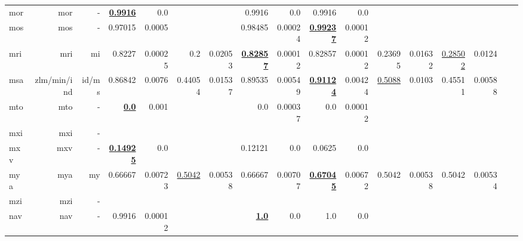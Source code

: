 \documentclass[11pt]{article}
\begin{document}
\begin{table*}[h]
{\begin{tabular}{lrrrrrrrrrrrrrrrr}
mor         & mor         & -         & \textbf{\underline{0.9916}}         & 0.0         &          &          & 0.9916         & 0.0         & 0.9916         & 0.0         &          &          &          &          \\
mos         & mos         & -         & 0.97015         & 0.0005         &          &          & 0.98485         & 0.00024         & \textbf{\underline{0.99237}}         & 0.00012         &          &          &          &          \\
mri         & mri         & mi         & 0.8227         & 0.00025         & 0.2         & 0.02053         & \textbf{\underline{0.82857}}         & 0.00012         & 0.82857         & 0.00012         & 0.23695         & 0.01632         & \underline{0.28502}         & 0.0124         \\
msa         & zlm/min/ind         & id/ms         & 0.86842         & 0.0076         & 0.44054         & 0.01537         & 0.89535         & 0.00549         & \textbf{\underline{0.91124}}         & 0.00424         & \underline{0.5088}         & 0.0103         & 0.45511         & 0.00588         \\
mto         & mto         & -         & \textbf{\underline{0.0}}         & 0.001         &          &          & 0.0         & 0.00037         & 0.0         & 0.00012         &          &          &          &          \\
mxi         & mxi         & -         &          &          &          &          &          &          &          &          &          &          &          &          \\
mxv         & mxv         & -         & \textbf{\underline{0.14925}}         & 0.0         &          &          & 0.12121         & 0.0         & 0.0625         & 0.0         &          &          &          &          \\
mya         & mya         & my         & 0.66667         & 0.00723         & \underline{0.5042}         & 0.00538         & 0.66667         & 0.00707         & \textbf{\underline{0.67045}}         & 0.00672         & 0.5042         & 0.00538         & 0.5042         & 0.00534         \\
mzi         & mzi         & -         &          &          &          &          &          &          &          &          &          &          &          &          \\
nav         & nav         & -         & 0.9916         & 0.00012         &          &          & \textbf{\underline{1.0}}         & 0.0         & 1.0         & 0.0         &          &          &          &          \\

\end{tabular}}
\end{table*}
\end{document}
